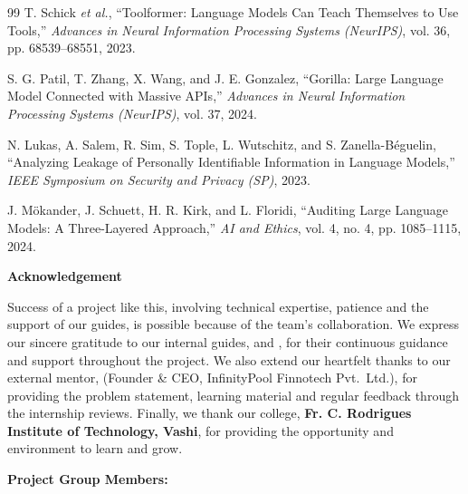 \begin{thebibliography}{99}
 T. Schick \textit{et al.}, ``Toolformer: Language Models Can Teach Themselves to Use Tools,'' \textit{Advances in Neural Information Processing Systems (NeurIPS)}, vol. 36, pp. 68539--68551, 2023.

 S. G. Patil, T. Zhang, X. Wang, and J. E. Gonzalez, ``Gorilla: Large Language Model Connected with Massive APIs,'' \textit{Advances in Neural Information Processing Systems (NeurIPS)}, vol. 37, 2024.

 N. Lukas, A. Salem, R. Sim, S. Tople, L. Wutschitz, and S. Zanella-B\'eguelin, ``Analyzing Leakage of Personally Identifiable Information in Language Models,'' \textit{IEEE Symposium on Security and Privacy (SP)}, 2023.

 J. M\"okander, J. Schuett, H. R. Kirk, and L. Floridi, ``Auditing Large Language Models: A Three-Layered Approach,'' \textit{AI and Ethics}, vol. 4, no. 4, pp. 1085--1115, 2024.

\end{thebibliography}

\clearpage
{}
\begin{center}{\LARGE\bfseries Acknowledgement\par}\end{center}
\vspace{-5pt}
\noindent Success of a project like this, involving technical expertise, patience and the support of our guides, is possible because of the team's collaboration. We express our sincere gratitude to our internal guides, \textbf{\InternalGuideOne} and \textbf{\InternalGuideTwo}, for their continuous guidance and support throughout the project. We also extend our heartfelt thanks to our external mentor, \textbf{\ExternalMentor} (Founder \& CEO, InfinityPool Finnotech Pvt.\ Ltd.), for providing the problem statement, learning material and regular feedback through the internship reviews. Finally, we thank our college, \textbf{Fr. C. Rodrigues Institute of Technology, Vashi}, for providing the opportunity and environment to learn and grow.

\vspace{25pt}
\textbf{Project Group Members:}\par\vspace{18pt}
\MemberSignatureBlock



